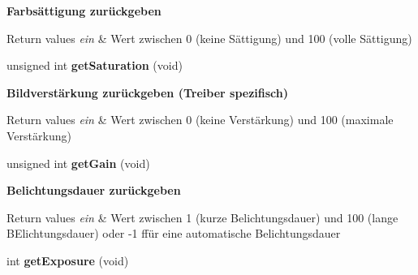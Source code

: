 \begin{Indent}{\bf Farbsättigung zurückgeben}\par
{\em 
\begin{DoxyRetVals}{Return values}
{\em ein} & Wert zwischen 0 (keine Sättigung) und 100 (volle Sättigung) \\
\hline
\end{DoxyRetVals}
}\begin{DoxyCompactItemize}
\item 
\hypertarget{classrc_1_1Camera_adf54b48540f83fdcecff277443fbc360}{unsigned int {\bfseries get\+Saturation} (void)}\label{classrc_1_1Camera_adf54b48540f83fdcecff277443fbc360}

\end{DoxyCompactItemize}
\end{Indent}
\begin{Indent}{\bf Bildverstärkung zurückgeben (Treiber spezifisch)}\par
{\em 
\begin{DoxyRetVals}{Return values}
{\em ein} & Wert zwischen 0 (keine Verstärkung) und 100 (maximale Verstärkung) \\
\hline
\end{DoxyRetVals}
}\begin{DoxyCompactItemize}
\item 
\hypertarget{classrc_1_1Camera_aa4f5ffc75180f60ba018f00669bddeee}{unsigned int {\bfseries get\+Gain} (void)}\label{classrc_1_1Camera_aa4f5ffc75180f60ba018f00669bddeee}

\end{DoxyCompactItemize}
\end{Indent}
\begin{Indent}{\bf Belichtungsdauer zurückgeben}\par
{\em 
\begin{DoxyRetVals}{Return values}
{\em ein} & Wert zwischen 1 (kurze Belichtungsdauer) und 100 (lange B\+Elichtungsdauer) oder -\/1 ffür eine automatische Belichtungsdauer \\
\hline
\end{DoxyRetVals}
}\begin{DoxyCompactItemize}
\item 
\hypertarget{classrc_1_1Camera_a6e906a0b175eb28fa1dd4dbab4aa697a}{int {\bfseries get\+Exposure} (void)}\label{classrc_1_1Camera_a6e906a0b175eb28fa1dd4dbab4aa697a}

\end{DoxyCompactItemize}
\end{Indent}
